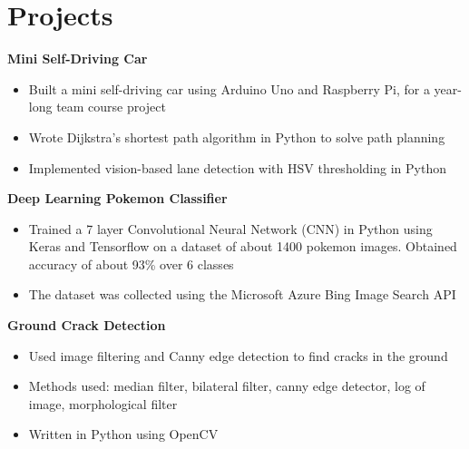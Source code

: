 \documentclass[letterpaper,11pt]{article}
\begin{document}

  


\section{\color{BlueViolet} Projects}
    \small
    \textbf{Mini Self-Driving Car} 
    \vspace{-4pt}
        \begin{itemize}
            \item Built a mini self-driving car using Arduino Uno and Raspberry Pi, for a year-long team course project
            \vspace{-3pt}
            \item Wrote Dijkstra's shortest path algorithm in Python to solve path planning
            \vspace{-3pt}
            \item Implemented vision-based lane detection with HSV thresholding in Python
        \end{itemize}
    \vspace{-2pt}

    \textbf{Deep Learning Pokemon Classifier} 
    \vspace{-4pt}
        \begin{itemize}
            \item Trained a 7 layer Convolutional Neural Network (CNN) in Python using Keras and Tensorflow on a dataset of about 1400 pokemon images. Obtained accuracy of about 93\% over 6 classes
            \vspace{-3pt}
            \item The dataset was collected using the Microsoft Azure Bing Image Search API
        \end{itemize}
    \vspace{-2pt}
    
    \textbf{Ground Crack Detection} 
    \vspace{-4pt}
        \begin{itemize}
            \item Used image filtering and Canny edge detection to find cracks in the ground
            \vspace{-3pt}
            \item Methods used: median filter, bilateral filter, canny edge detector, log of image, morphological filter
            \vspace{-3pt}
            \item Written in Python using OpenCV
        \end{itemize}
    \vspace{-2pt}
\end{document}
